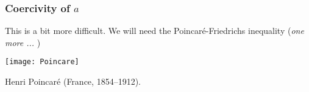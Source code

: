 \subsubsection{Coercivity of $a$}

This is a bit more difficult. We will need the Poincar\'e-Friedrichs inequality
(\emph{one more ... })
%
\begin{marginfigure}[-2.0cm]
       \texttt{[image: Poincare]}
       \caption[]{Henri Poincar\'e (France, 1854--1912).} 
\end{marginfigure}

